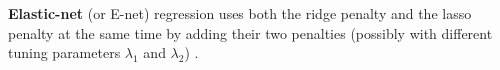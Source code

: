 \documentclass{article}
\newcommand{\argmin}[2]{\underset{#1}{\text{arg min}}\left\{#2\right\}}
\begin{document}

	
	\textbf{Elastic-net} (or E-net) regression uses both the ridge penalty and the lasso penalty at the same time by adding their two penalties (possibly with different tuning parameters $\lambda_1$ and $\lambda_2$) \cite{zou2005regularization}.
	
\end{document}
